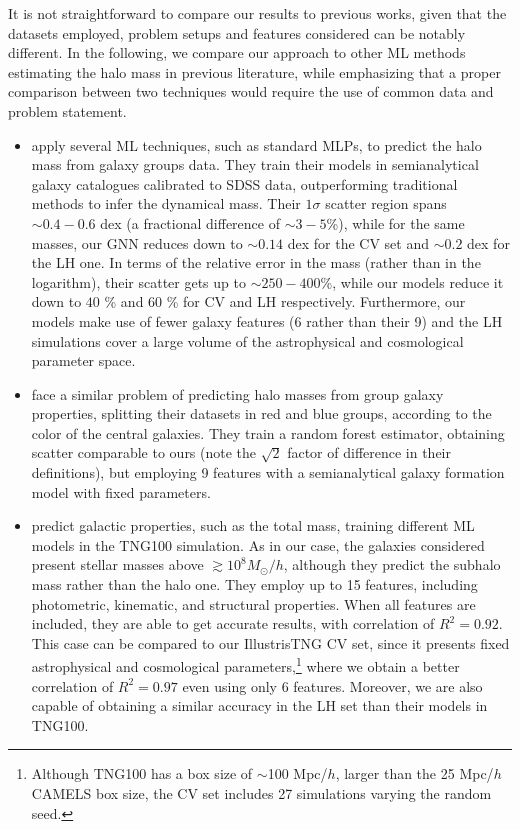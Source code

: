 \documentclass[twocolumn]{aastex631}
\begin{document}
It is not straightforward to compare our results to previous works, given that the datasets employed, problem setups and features considered can be notably different. In the following, we compare our approach to other ML methods estimating the halo mass in previous literature, while emphasizing that a proper comparison between two techniques would require the use of common data and problem statement.

\begin{itemize}

\item \cite{2019MNRAS.490.2367C} apply several ML techniques, such as standard MLPs, to predict the halo mass from galaxy groups data. They train their models in semianalytical galaxy catalogues calibrated to SDSS data, outperforming traditional methods to infer the dynamical mass. Their $1\sigma$ scatter region spans $\sim 0.4-0.6$ dex (a fractional difference of $\sim 3 - 5$\%), while for the same masses, our GNN reduces down to $\sim 0.14$ dex for the CV set and $\sim 0.2$ dex for the LH one. In terms of the relative error in the mass (rather than in the logarithm), their scatter gets up to $\sim 250-400$\%, while our models reduce it down to $40$ \% and $60$ \% for CV and LH respectively. Furthermore, our models make use of fewer galaxy features (6 rather than their 9) and the LH simulations cover a large volume of the astrophysical and cosmological parameter space.

\item \cite{2019ApJ...881...74M} face a similar problem of predicting halo masses from group galaxy properties, splitting their datasets in red and blue groups, according to the color of the central galaxies. They train a random forest estimator, obtaining scatter comparable to ours (note the $\sqrt{2}$ factor of difference in their definitions), but employing 9 features with a semianalytical galaxy formation model with fixed parameters.

\item \cite{2021arXiv211101185V} predict galactic properties, such as the total mass, training different ML models in the TNG100 simulation. As in our case, the galaxies considered present stellar masses above $\gtrsim 10^8 M_\odot/h$, although they predict the subhalo mass rather than the halo one. They employ up to 15 features, including photometric, kinematic, and structural properties. When all features are included, they are able to get accurate results, with correlation of $R^2 =0.92$. This case can be compared to our IllustrisTNG CV set, since it presents fixed astrophysical and cosmological parameters,\footnote{Although TNG100 has a box size of $\sim$100 Mpc/$h$, larger than the 25 Mpc/$h$ CAMELS box size, the CV set includes 27 simulations varying the random seed.} where we obtain a better correlation of $R^2 =0.97$ even using only 6 features. Moreover, we are also capable of obtaining a similar accuracy in the LH set than their models in TNG100.


\end{itemize}
\end{document}
